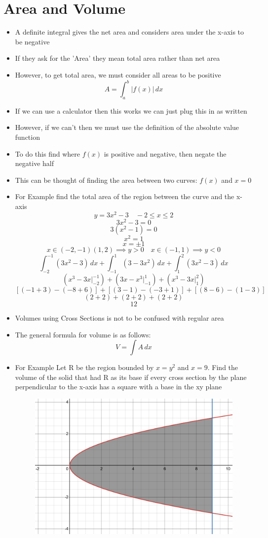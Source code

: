 \documentclass{article}
\newcommand{\intbar}{\biggr\rvert}
\begin{document}
\section{Area and Volume}
\begin{itemize}
    \item A definite integral gives the net area and considers area under the x-axis to be negative
    \item If they ask for the 'Area' they mean total area rather than net area
    \item However, to get total area, we must consider all areas to be positive
        \[A=\int_a^b|f(x)|\,dx\]
    \item If we can use a calculator then this works we can just plug this in as written
    \item However, if we can't then we must use the definition of the absolute value function
    \item To do this find where $f(x)$ is positive and negative, then negate the negative half
    \item This can be thought of finding the area between two curves: $f(x)$ and $x=0$
    \item For Example find the total area of the region between the curve and the x-axis
        \[y = 3x^2-3\quad-2\leq x\leq2\]
        \[3x^2-3 = 0\]
        \[3\left(x^2-1\right) = 0\]
        \[x^2 = 1\]
        \[x = \pm1\]
        \[x\in(-2,-1)(1,2)\implies y>0\quad x\in(-1,1)\implies y<0\]
        \[\int_{-2}^{-1}\left(3x^2-3\right)\,dx+\int_{-1}^1\left(3-3x^2\right)\,dx+\int_1^2\left(3x^2-3\right)\,dx\]
        \[\left(x^3-3x\intbar_{-2}^{-1}\right)+\left(3x-x^3\intbar_{-1}^1\right)+\left(x^3-3x\intbar_1^2\right)\]
        \[\left[(-1+3)-(-8+6)\right]+\left[(3-1)-(-3+1)\right]+\left[(8-6)-(1-3)\right]\]
        \[(2+2)+(2+2)+(2+2)\]
        \[\boxed{12}\]
    \item Volumes using Cross Sections is not to be confused with regular area
    \item The general formula for volume is as follows:
        \[V = \int A\,dx\]
    \newpage
    \item For Example Let R be the region bounded by $x=y^2$ and $x=9$. Find the volume of the solid that had R as its base if every cross section by the plane perpendicular to the x-axis has a square with a base in the xy plane
    \begin{figure}[h]
        \centering
        \includegraphics[width=0.5\linewidth]{images/Cross Section.png}

\end{figure}
\end{itemize}
\end{document}
